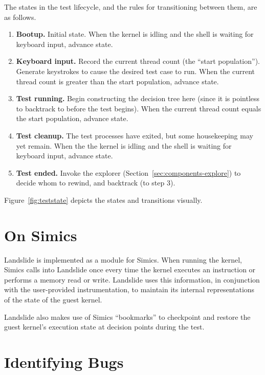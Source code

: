 The states in the test lifecycle, and the rules for transitioning between them, are as follows.

\begin{enumerate}
	\item {\bf Bootup.} Initial state. When the kernel is idling and the shell is waiting for keyboard input, advance state.
	\item {\bf Keyboard input.} Record the current thread count (the ``start population''). Generate keystrokes to cause the desired test case to run.
		When the current thread count is greater than the start population, advance state.
	\item {\bf Test running.} Begin constructing the decision tree here (since it is pointless to backtrack to before the test begins). When the current thread count equals the start population, advance state.
	\item {\bf Test cleanup.} The test processes have exited, but some housekeeping may yet remain. When the the kernel is idling and the shell is waiting for keyboard input, advance state.
	\item {\bf Test ended.} Invoke the explorer (Section~\ref{sec:components-explore}) to decide whom to rewind, and backtrack (to step 3).
\end{enumerate}

Figure~\ref{fig:teststate} depicts the states and transitions visually.


\section{On Simics}

Landslide is implemented as a module for Simics\cite{simics}. When running the kernel, Simics calls into Landslide once every time the kernel executes an instruction or performs a memory read or write. Landslide uses this information, in conjunction with the user-provided instrumentation, to maintain its internal representations of the state of the guest kernel.

Landslide also makes use of Simics ``bookmarks'' to checkpoint and restore the guest kernel's execution state at decision points during the test.

\section{Identifying Bugs}
\label{sec:techniques-bugs}

